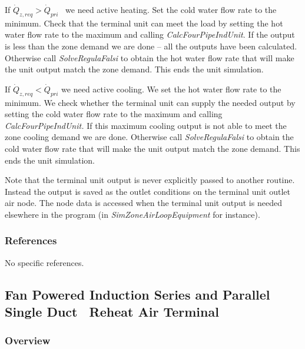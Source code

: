 If \({\dot Q_{z,req}} > {\dot Q_{pri}}\) ~we need active heating. Set the cold water flow rate to the minimum. Check that the terminal unit can meet the load by setting the hot water flow rate to the maximum and calling \emph{CalcFourPipeIndUnit}. If the output is less than the zone demand we are done -- all the outputs have been calculated. Otherwise call \emph{SolveRegulaFalsi} to obtain the hot water flow rate that will make the unit output match the zone demand. This ends the unit simulation.

If \({\dot Q_{z,req}} < {\dot Q_{pri}}\) we need active cooling. We set the hot water flow rate to the minimum. We check whether the terminal unit can supply the needed output by setting the cold water flow rate to the maximum and calling \emph{CalcFourPipeIndUnit.} If this maximum cooling output is not able to meet the zone cooling demand we are done. Otherwise call \emph{SolveRegulaFalsi} to obtain the cold water flow rate that will make the unit output match the zone demand. This ends the unit simulation.

Note that the terminal unit output is never explicitly passed to another routine. Instead the output is saved as the outlet conditions on the terminal unit outlet air node. The node data is accessed when the terminal unit output is needed elsewhere in the program (in \emph{SimZoneAirLoopEquipment} for instance).

\subsubsection{References}\label{references-1-000}

No specific references.

\subsection{Fan Powered Induction Series and Parallel Single Duct~ Reheat Air Terminal}\label{fan-powered-induction-series-and-parallel-single-duct-reheat-air-terminal}

\subsubsection{Overview}\label{overview-1-000}

